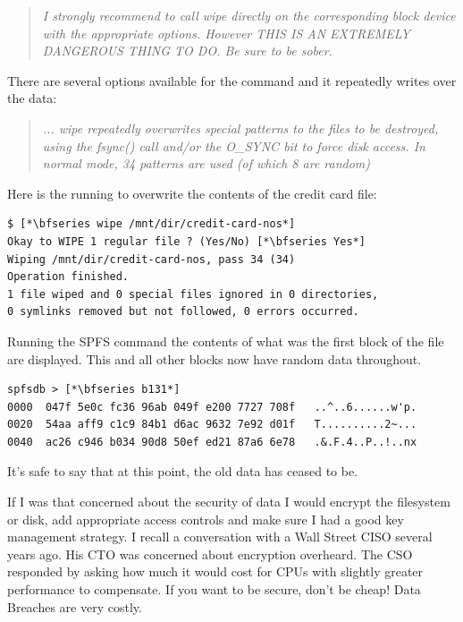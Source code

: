 \begin{quote}
\textit{I strongly recommend to call wipe directly on the corresponding block device with the appropriate options. However THIS IS AN EXTREMELY DANGEROUS THING TO DO.  Be sure to be sober.}
\end{quote}

\noindent
There are several options available for the command and it repeatedly writes over the data:

\begin{quote}
\textit{... wipe repeatedly overwrites special patterns to the files to  be  destroyed,  using  the fsync()  call  and/or  the  O\_SYNC  bit to force disk access. In normal mode, 34 patterns are used (of which 8 are random)}
\end{quote}

\noindent
Here is the  running to overwrite the contents of the credit card file:

\begin{lstlisting}
$ [*\bfseries wipe /mnt/dir/credit-card-nos*]
Okay to WIPE 1 regular file ? (Yes/No) [*\bfseries Yes*]
Wiping /mnt/dir/credit-card-nos, pass 34 (34)   
Operation finished.                                                           
1 file wiped and 0 special files ignored in 0 directories, 
0 symlinks removed but not followed, 0 errors occurred.
\end{lstlisting}

\noindent
Running the SPFS  command the contents of what was the first block of the file are displayed. This and all other blocks now have random data throughout.

\begin{lstlisting}
spfsdb > [*\bfseries b131*]
0000  047f 5e0c fc36 96ab 049f e200 7727 708f   ..^..6......w'p.
0020  54aa aff9 c1c9 84b1 d6ac 9632 7e92 d01f   T..........2~...
0040  ac26 c946 b034 90d8 50ef ed21 87a6 6e78   .&.F.4..P..!..nx
\end{lstlisting}

\noindent
It's safe to say that at this point, the old data has ceased to be.

If I was that concerned about the security of data I would encrypt the filesystem or disk, add appropriate access controls and make sure I had a good key management strategy. I recall a conversation with a Wall Street CISO several years ago. His CTO was concerned about encryption overheard. The CSO responded by asking how much it would cost for CPUs with slightly greater performance to compensate. If you want to be secure, don't be cheap! Data Breaches are very costly.

